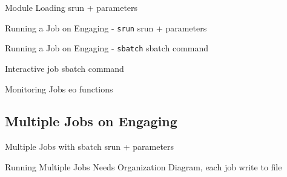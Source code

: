 \documentclass{beamer}
\begin{document}
\begin{frame}{Module Loading}
  srun + parameters
\end{frame}

\begin{frame}{Running a Job on Engaging - \texttt{srun}}
  srun + parameters
\end{frame}

\begin{frame}{Running a Job on Engaging - \texttt{sbatch}}
  sbatch command
\end{frame}

\begin{frame}{Interactive job}
  sbatch command
\end{frame}

\begin{frame}{Monitoring Jobs}
  eo functions
\end{frame}

\subsection{Multiple Jobs on Engaging}

\begin{frame}{Multiple Jobs with sbatch}
  srun + parameters
\end{frame}

\begin{frame}{Running Multiple Jobs Needs Organization}
  Diagram, each job write to file
\end{frame}
\end{document}
